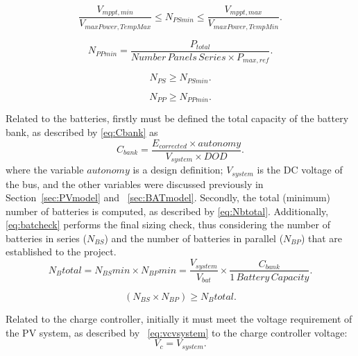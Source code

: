 \documentclass[review]{elsarticle}
\begin{document}
\begin{equation}
\label{eq:NPSmin}
\dfrac{V_{mppt,min}}{V_{maxPower,TempMax}}\leq N_{PSmin} \leq \dfrac{V_{mppt,max}}{V_{maxPower,TempMin}}.
\end{equation}

\begin{equation}
\label{eq:NPPmin}
N_{PPmin} = \dfrac{P_{total}}{Number\,Panels\,Series \times P_{max,ref}}.
\end{equation}

\begin{equation}
\label{eq:NPS}
N_{PS} \geq N_{PSmin}.
\end{equation}

\begin{equation}
\label{eq:NPP}
N_{PP} \geq N_{PPmin}.
\end{equation}

Related to the batteries, firstly must be defined the total capacity of the battery bank, as described by \eqref{eq:Cbank} as
\begin{equation}
\label{eq:Cbank}
C_{bank} = \dfrac{E_{corrected} \times autonomy}{V_{system} \times DOD}.
\end{equation}
%
\noindent where the variable $autonomy$ is a design definition; %
$ V_{system} $ is the DC voltage of the bus, and the other variables were discussed previously in Section~\ref{sec:PVmodel} and ~\ref{sec:BATmodel}.
%
Secondly, the total (minimum) number of batteries is computed, as described by \eqref{eq:Nbtotal}. Additionally, \eqref{eq:batcheck} performs the final sizing check, thus considering the number of batteries in series ($ N_{BS} $) and the number of batteries in parallel ($ N_{BP} $) that are established to the project.
\begin{equation}
\label{eq:Nbtotal}
N_{B}total = N_{BS}min \times N_{BP}min = \dfrac{V_{system}}{V_{bat}} \times \dfrac{C_{bank}}{1 \,Battery \, Capacity}.
\end{equation}

\begin{equation}
\label{eq:batcheck}
\left( N_{BS} \times  N_{BP} \right) \geq N_{B}total.
\end{equation}

Related to the charge controller, initially it must meet the voltage requirement of the PV system, as described by ~\eqref{eq:vcvsystem} to the charge controller voltage: 
\begin{equation}
\label{eq:vcvsystem}
V_{c} = V_{system}.
\end{equation}
\end{document}
